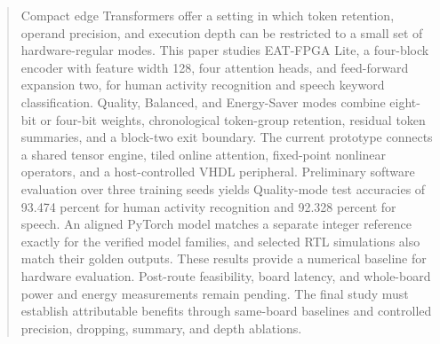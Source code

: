 \begin{abstract}
Compact edge Transformers offer a setting in which token retention, operand
precision, and execution depth can be restricted to a small set of
hardware-regular modes. This paper studies EAT-FPGA Lite, a four-block encoder
with feature width 128, four attention heads, and feed-forward expansion two,
for human activity recognition and speech keyword classification. Quality,
Balanced, and Energy-Saver modes combine eight-bit or four-bit weights,
chronological token-group retention, residual token summaries, and a block-two
exit boundary. The current prototype connects a shared tensor engine, tiled
online attention, fixed-point nonlinear operators, and a host-controlled VHDL
peripheral. Preliminary software evaluation over three training seeds yields
Quality-mode test accuracies of 93.474 percent for human activity recognition
and 92.328 percent for speech. An aligned PyTorch model matches a separate
integer reference exactly for the verified model families, and selected RTL
simulations also match their golden outputs. These results provide a numerical
baseline for hardware evaluation. Post-route feasibility, board latency, and
whole-board power and energy measurements remain pending. The final study
must establish attributable benefits through same-board baselines and
controlled precision, dropping, summary, and depth ablations.
\end{abstract}
